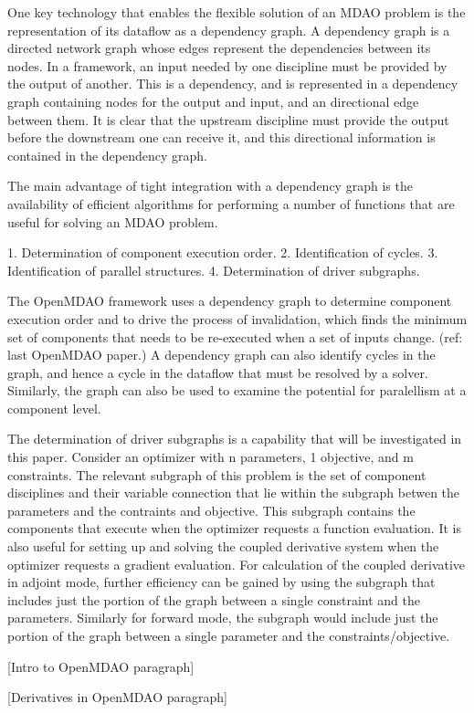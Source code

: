 
One key technology that enables the flexible solution of an MDAO problem is the representation
of its dataflow as a dependency graph. A dependency graph is a directed network graph whose
edges represent the dependencies between its nodes. In a framework, an input needed by one
discipline must be provided by the output of another. This is a dependency, and is represented 
in a dependency graph containing nodes for the output and input, and an directional edge
between them. It is clear that the upstream discipline must provide the output before the 
downstream one can receive it, and this directional information is contained in the dependency
graph.

The main advantage of tight integration with a dependency graph is the availability of efficient
algorithms for performing a number of functions that are useful for solving an MDAO problem.

  1. Determination of component execution order.
  2. Identification of cycles.
  3. Identification of parallel structures.
  4. Determination of driver subgraphs.
  
The OpenMDAO framework uses a dependency graph to determine component execution order and to
drive the process of invalidation, which finds the minimum set of components that needs to
be re-executed when a set of inputs change. (ref: last OpenMDAO paper.) A dependency graph
can also identify cycles in the graph, and hence a cycle in the dataflow that must be resolved
by a solver. Similarly, the graph can also be used to examine the potential for paralellism at
a component level.

The determination of driver subgraphs is a capability that will be investigated in this paper.
Consider an optimizer with n parameters, 1 objective, and m constraints. The relevant 
subgraph of this problem is the set of component disciplines and their variable connection that
lie within the subgraph betwen the parameters and the contraints and objective. This subgraph
contains the components that execute when the optimizer requests a function evaluation. It is
also useful for setting up and solving the coupled derivative system when the optimizer requests
a gradient evaluation. For calculation of the coupled derivative in adjoint mode, further
efficiency can be gained by using the subgraph that includes just the portion of the graph 
between a single constraint and the parameters. Similarly for forward mode, the subgraph would
include just the portion of the graph between a single parameter and the constraints/objective.

[Intro to OpenMDAO paragraph]

[Derivatives in OpenMDAO paragraph]
